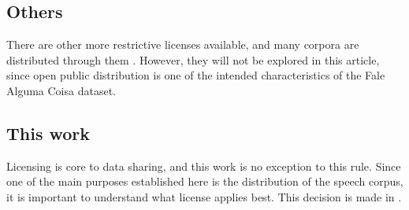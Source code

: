 \subsection{Others}

There are other more restrictive licenses available, and many corpora are distributed through them \cite{Lamel1992timmit}. However, they will not be explored in this article, since open public distribution is one of the intended characteristics of the Fale Alguma Coisa dataset.

\subsection{This work}

Licensing is core to data sharing, and this work is no exception to this rule. Since one of the main purposes established here is the distribution of the speech corpus, it is important to understand what license applies best. This decision is made in \cite{sec:proposal-data-publication}.